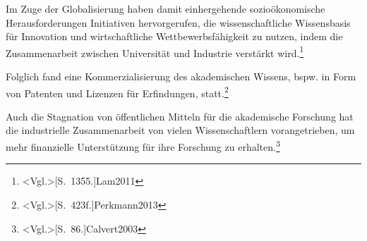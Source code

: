 Im Zuge der Globalisierung haben damit einhergehende sozioökonomische Herausforderungen Initiativen hervorgerufen, die wissenschaftliche Wissensbasis für Innovation und wirtschaftliche Wettbewerbsfähigkeit zu nutzen, indem die Zusammenarbeit zwischen Universität und Industrie verstärkt wird.\footnote{\citeNP<Vgl.>[S.~1355.]{Lam2011}}

Folglich fand eine Kommerzialisierung des akademischen Wissens, bspw. in Form von Patenten und Lizenzen für Erfindungen, statt.\footnote{\citeNP<Vgl.>[S.~423f.]{Perkmann2013}}

Auch die Stagnation von öffentlichen Mitteln für die akademische Forschung hat die industrielle Zusammenarbeit von vielen Wissenschaftlern vorangetrieben, um mehr finanzielle Unterstützung für ihre Forschung zu erhalten.\footnote{\citeNP<Vgl.>[S.~86.]{Calvert2003}}
